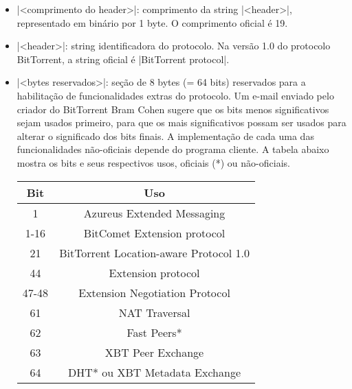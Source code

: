 \begin{itemize}
    \item \bverb|<comprimento do header>|: comprimento da string \bverb|<header>|,
        representado em binário por 1 byte. O comprimento oficial é 19.

    \item \bverb|<header>|: \gls*{string} identificadora do protocolo. Na versão 1.0 do
        protocolo BitTorrent, a \gls*{string} oficial é \sverb|BitTorrent protocol|.

    \item \bverb|<bytes reservados>|: seção de 8 bytes (= 64 bits) reservados para a
        habilitação de funcionalidades extras do protocolo. Um e-mail enviado pelo
        criador do BitTorrent Bram Cohen \cite{wikitheory:reserved-bytes} sugere que os
        bits menos significativos sejam usados primeiro, para que os mais significativos
        possam ser usados para alterar o significado dos bits finais. A implementação de
        cada uma das funcionalidades não-oficiais depende do programa cliente. A tabela
        abaixo mostra os bits e seus respectivos usos, oficiais (*) ou não-oficiais.

        \begin{center}
            \begin{tabular}{ | c | c |}
            \hline
            \textbf{Bit} & \textbf{Uso}                         \\ \hline
            1       & Azureus Extended Messaging                \\ \hline
            1-16    & BitComet Extension protocol               \\ \hline
            21      & BitTorrent Location-aware Protocol 1.0    \\ \hline
            44      & Extension protocol                        \\ \hline
            47-48   & Extension Negotiation Protocol            \\ \hline
            61      & NAT Traversal                             \\ \hline
            62      & Fast Peers*                               \\ \hline
            63      & XBT Peer Exchange                         \\ \hline
            64      & DHT* ou XBT Metadata Exchange             \\ \hline
            \end{tabular}
        \end{center}


\end{itemize}
